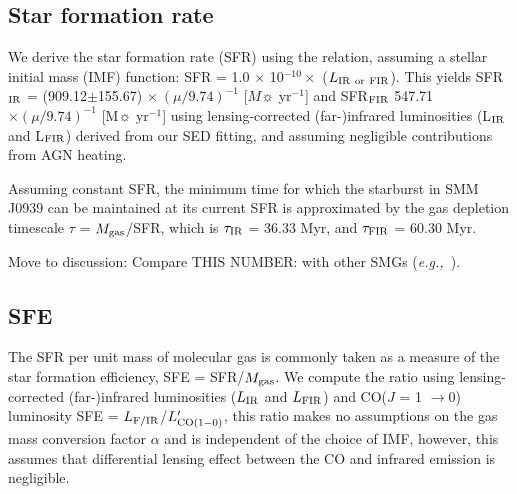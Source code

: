 \documentclass{emulateapj}
\newcommand{\rarr}{$\rightarrow$}
\newcommand{\Lp}{\mbox{$L^{\prime}_{\rm CO(1-0)}$}}
\newcommand{\eg}{{\sl e.g.,~}}
\newcommand{\pmOne}{$^{-1}$}
\begin{document}

\subsection{Star formation rate}
We derive the star formation rate (SFR) using the \citet{Kennicutt98a} relation, assuming a \citet{Chabrier03a}
stellar initial mass (IMF) function: SFR = 1.0 $\times$ 10$^{-10}\times$ ($L_{\rm IR\ or\ FIR}$). This yields SFR$_{\rm IR}$ 
= (909.12$\pm$155.67) $\times\ (\mu/9.74)^{-1}$ [$M\sun$ yr\pmOne] and SFR$_{\rm FIR}$ 547.71$\times(\mu/9.74)^{-1}$ [M$
\sun$ yr\pmOne] using lensing-corrected (far-)infrared luminosities (L$_{\rm IR}$ and L$_{\rm FIR}$) derived from our SED 
fitting, and assuming negligible contributions from AGN heating.

Assuming constant SFR, the minimum time for which the starburst in SMM J0939 can be maintained at its
current SFR is approximated by the gas depletion timescale $\tau$ = $M_{\rm gas}$/SFR, which is $\tau_{\rm IR}$ = 36.33 
Myr, and $\tau_{\rm FIR}$ = 60.30 Myr.

Move to discussion: Compare THIS NUMBER: with other SMGs (\eg \citep{Greve05a}). 

\subsection{SFE}

The SFR per unit mass of molecular gas is commonly taken as a
measure of the star formation efficiency, SFE = SFR/$M_{\rm gas}$. We compute the ratio using lensing-corrected (far-)infrared 
luminosities ($L_{\rm IR}$ and $L_{\rm FIR}$) and CO($J$ = 1 \rarr 0) luminosity SFE = $L_{\rm F/IR}$/\Lp, this ratio makes no assumptions on the gas mass conversion factor $\alpha$ and is independent of the 
choice of IMF, however, this assumes that differential lensing effect between the CO and infrared emission is negligible.
\end{document}
